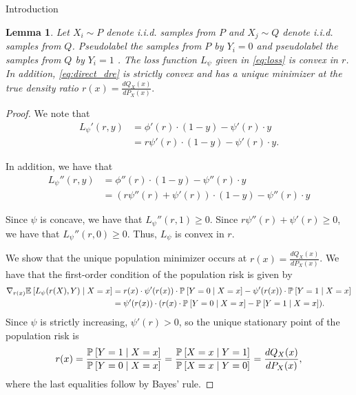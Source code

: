 \documentclass{article}
\theoremstyle{definition}
\theoremstyle{plain}
\newtheorem{lemm}[prop]{Lemma}
\theoremstyle{remark}
\begin{document}
\begin{section}{Introduction}
\begin{lemm}
Let $X_{i} \sim P$ denote i.i.d. samples from $P$ and $X_{j} \sim Q$ denote i.i.d. samples from $Q$. Pseudolabel the samples from $P$ by $Y_{i} = 0$ and pseudolabel the samples from $Q$ by $Y_{i}=1$ . The loss function $L_{\psi}$ given in \eqref{eq:loss} is convex in $r$. In addition, \eqref{eq:direct_dre} is strictly convex and has a unique minimizer at the true density ratio $r(x) = \frac{dQ_{X}(x)}{dP_{X}(x)}.$
\end{lemm}

\begin{proof}
We note that
\begin{align*}
L_{\psi}'(r, y) &= \phi'(r) \cdot (1 - y) - \psi'(r) \cdot y \\
&= r \psi'(r) \cdot (1 - y) - \psi'(r) \cdot y.
\end{align*}

In addition, we have that
\begin{align*}
L_{\psi}''(r, y) &= \phi''(r) \cdot (1 - y) - \psi''(r) \cdot y \\
&= (r\psi''(r) + \psi'(r)) \cdot (1 - y) - \psi''(r) \cdot y
\end{align*}

Since $\psi$ is concave, we have that $L_{\psi}''(r, 1) \geq 0$. Since $r\psi''(r) + \psi'(r) \geq 0$, we have that $L_{\psi}''(r, 0) \geq 0$. Thus, $L_{\psi}$ is convex in $r$.

We show that the unique population minimizer occurs at $r(x) = \frac{dQ_{X}(x)}{dP_{X}(x)}$. We have that the first-order condition of the population risk is given by 
\begin{align*}
\nabla_{r(x)} \EE[]{L_{\psi}(r(X), Y) \mid X=x} &= r(x) \cdot \psi'(r(x)) \cdot \PP[]{Y=0 \mid X=x} - \psi'(r(x)) \cdot \PP[]{Y=1 \mid X=x} \\
&= \psi'(r(x))  \cdot (r(x) \cdot \PP[]{Y=0 \mid X=x} - \PP[]{Y=1 \mid X=x}).
\end{align*}
Since $\psi$ is strictly increasing, $\psi'(r) > 0$, so the unique stationary point of the population risk is 
\begin{align*}
r(x) &= \frac{\PP[]{Y=1 \mid X=x}}{\PP[]{Y=0 \mid X=x}} =\frac{\PP[]{X=x \mid Y=1}}{\PP[]{X=x \mid Y= 0}} = \frac{dQ_{X}(x)}{dP_{X}(x)},\\
\end{align*}
where the last equalities follow by Bayes' rule.

\end{proof}

\end{section}


 

\end{document}
